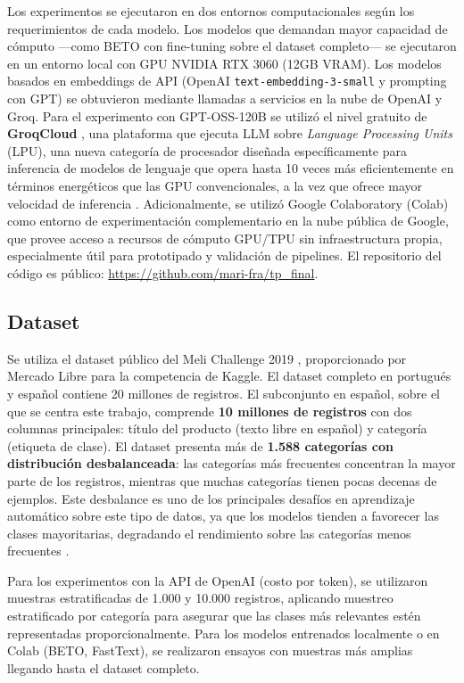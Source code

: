 \documentclass[11pt,a4paper]{article}
\begin{document}
Los experimentos se ejecutaron en dos entornos computacionales según los requerimientos de cada modelo. Los modelos que demandan mayor capacidad de cómputo ---como BETO con fine-tuning sobre el dataset completo--- se ejecutaron en un entorno local con GPU NVIDIA RTX 3060 (12GB VRAM). Los modelos basados en embeddings de API (OpenAI \texttt{text-embedding-3-small} y prompting con GPT) se obtuvieron mediante llamadas a servicios en la nube de OpenAI y Groq. Para el experimento con GPT-OSS-120B se utilizó el nivel gratuito de \textbf{GroqCloud} \cite{groq2024}, una plataforma que ejecuta LLM sobre \emph{Language Processing Units} (LPU), una nueva categoría de procesador diseñada específicamente para inferencia de modelos de lenguaje que opera hasta 10 veces más eficientemente en términos energéticos que las GPU convencionales, a la vez que ofrece mayor velocidad de inferencia \cite{groq-lpu}. Adicionalmente, se utilizó Google Colaboratory (Colab) como entorno de experimentación complementario en la nube pública de Google, que provee acceso a recursos de cómputo GPU/TPU sin infraestructura propia, especialmente útil para prototipado y validación de pipelines. El repositorio del código es público: \url{https://github.com/mari-fra/tp_final}.

\subsection{Dataset}

Se utiliza el dataset público del Meli Challenge 2019 \cite{meli2019}, proporcionado por Mercado Libre para la competencia de Kaggle. El dataset completo en portugués y español contiene 20 millones de registros. El subconjunto en español, sobre el que se centra este trabajo, comprende \textbf{10 millones de registros} con dos columnas principales: título del producto (texto libre en español) y categoría (etiqueta de clase). El dataset presenta más de \textbf{1.588 categorías con distribución desbalanceada}: las categorías más frecuentes concentran la mayor parte de los registros, mientras que muchas categorías tienen pocas decenas de ejemplos. Este desbalance es uno de los principales desafíos en aprendizaje automático sobre este tipo de datos, ya que los modelos tienden a favorecer las clases mayoritarias, degradando el rendimiento sobre las categorías menos frecuentes \cite{he2009}.

Para los experimentos con la API de OpenAI (costo por token), se utilizaron muestras estratificadas de 1.000 y 10.000 registros, aplicando muestreo estratificado por categoría para asegurar que las clases más relevantes estén representadas proporcionalmente. Para los modelos entrenados localmente o en Colab (BETO, FastText), se realizaron ensayos con muestras más amplias llegando hasta el dataset completo.
\end{document}
